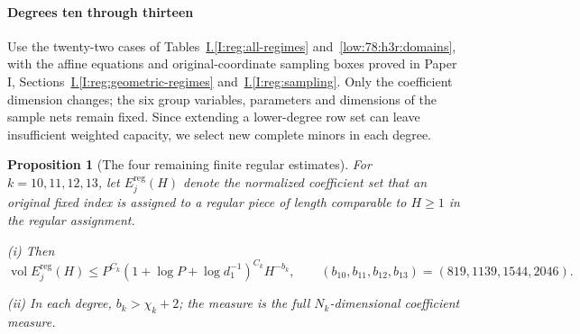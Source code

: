\documentclass[11pt]{amsart}
\newtheorem{proposition}[theorem]{Proposition}
\theoremstyle{definition}
\theoremstyle{remark}
\DeclareMathOperator{\vol}{vol}
\numberwithin{equation}{section}
\newcommand{\partIref}[1]{\hyperref[I:#1]{I.\ref*{I:#1}}}
\begin{document}
\paragraph{Degrees ten through thirteen}
Use the twenty-two cases of Tables~\partIref{reg:all-regimes} and~\ref{low:78:h3r:domains}, with the affine equations and original-coordinate sampling boxes proved in Paper I, Sections~\partIref{reg:geometric-regimes} and~\partIref{reg:sampling}. Only the coefficient dimension changes; the six group variables, parameters and dimensions of the sample nets remain fixed. Since extending a lower-degree row set can leave insufficient weighted capacity, we select new complete minors in each degree.

\begin{proposition}[The four remaining finite regular estimates]\label{low:regular-ten-thirteen}
For $k=10,11,12,13$, let $E_j^{\mathrm{reg}}(H)$ denote the normalized coefficient set that an original fixed index is assigned to a regular piece of length comparable to $H\ge1$ in the regular assignment.

\noindent\textup{(i)} Then
\[
\vol E_j^{\mathrm{reg}}(H)\le P^{C_k}(1+\log P+\log d_1^{-1})^{C_k}H^{-b_k},
\qquad (b_{10},b_{11},b_{12},b_{13})=(819,1139,1544,2046).
\]

\noindent\textup{(ii)} In each degree, $b_k>\chi_k+2$; the measure is the full $N_k$-dimensional coefficient measure.
\end{proposition}
\end{document}
